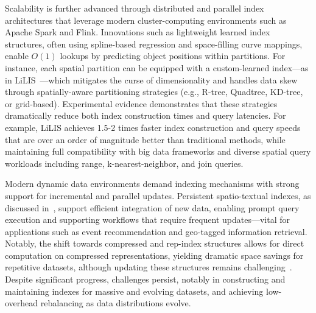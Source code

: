 \documentclass[sigconf]{acmart}
\begin{document}
Scalability is further advanced through distributed and parallel index architectures that leverage modern cluster-computing environments such as Apache Spark and Flink. Innovations such as lightweight learned index structures, often using spline-based regression and space-filling curve mappings, enable $O(1)$ lookups by predicting object positions within partitions. For instance, each spatial partition can be equipped with a custom-learned index---as in LiLIS~\cite{ref111}---which mitigates the curse of dimensionality and handles data skew through spatially-aware partitioning strategies (e.g., R-tree, Quadtree, KD-tree, or grid-based). Experimental evidence demonstrates that these strategies dramatically reduce both index construction times and query latencies. For example, LiLIS achieves 1.5-2 times faster index construction and query speeds that are over an order of magnitude better than traditional methods, while maintaining full compatibility with big data frameworks and diverse spatial query workloads including range, k-nearest-neighbor, and join queries.

Modern dynamic data environments demand indexing mechanisms with strong support for incremental and parallel updates. Persistent spatio-textual indexes, as discussed in~\cite{ref114,ref118}, support efficient integration of new data, enabling prompt query execution and supporting workflows that require frequent updates---vital for applications such as event recommendation and geo-tagged information retrieval. Notably, the shift towards compressed and rep-index structures allows for direct computation on compressed representations, yielding dramatic space savings for repetitive datasets, although updating these structures remains challenging~\cite{ref118}. Despite significant progress, challenges persist, notably in constructing and maintaining indexes for massive and evolving datasets, and achieving low-overhead rebalancing as data distributions evolve.
\end{document}
